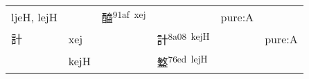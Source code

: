 \documentclass[14pt,a4paper]{scrartcl}
\begin{document}
\begin{longtable}[c]{@{}llllll@{}}
\begin{minipage}[t]{0.14\columnwidth}\raggedright\strut
ljeH, lejH
\strut\end{minipage} &
\begin{minipage}[t]{0.14\columnwidth}\raggedright\strut
\strut\end{minipage} &
\begin{minipage}[t]{0.14\columnwidth}\raggedright\strut
醯\textsuperscript{91af~xej}
\strut\end{minipage} &
\begin{minipage}[t]{0.14\columnwidth}\raggedright\strut
\strut\end{minipage} &
\begin{minipage}[t]{0.14\columnwidth}\raggedright\strut
pure:A
\strut\end{minipage}\tabularnewline
\begin{minipage}[t]{0.14\columnwidth}\raggedright\strut
計
\strut\end{minipage} &
\begin{minipage}[t]{0.14\columnwidth}\raggedright\strut
xej
\strut\end{minipage} &
\begin{minipage}[t]{0.14\columnwidth}\raggedright\strut
\strut\end{minipage} &
\begin{minipage}[t]{0.14\columnwidth}\raggedright\strut
計\textsuperscript{8a08~kejH}
\strut\end{minipage} &
\begin{minipage}[t]{0.14\columnwidth}\raggedright\strut
\strut\end{minipage} &
\begin{minipage}[t]{0.14\columnwidth}\raggedright\strut
pure:A
\strut\end{minipage}\tabularnewline
\begin{minipage}[t]{0.14\columnwidth}\raggedright\strut
𥃎
\strut\end{minipage} &
\begin{minipage}[t]{0.14\columnwidth}\raggedright\strut
kejH
\strut\end{minipage} &
\begin{minipage}[t]{0.14\columnwidth}\raggedright\strut
\strut\end{minipage} &
\begin{minipage}[t]{0.14\columnwidth}\raggedright\strut
盭\textsuperscript{76ed~lejH}
\strut\end{minipage} &
\begin{minipage}[t]{0.14\columnwidth}\raggedright\strut

\end{minipage}
\end{longtable}
\end{document}
